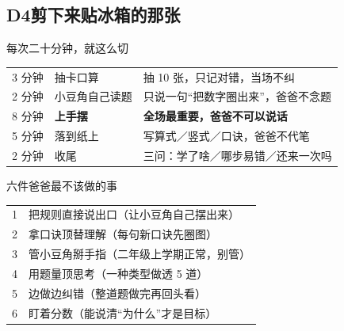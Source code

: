 \clearpage
\subsection*{D4\quad 剪下来贴冰箱的那张}

\begin{center}
\begin{tcolorbox}[enhanced,colback=white,colframe=mainc,boxrule=1.2pt,
                  arc=2mm,width=16.6cm,left=10pt,right=10pt,top=8pt,bottom=8pt]
\begin{center}
{\heiti\large 每次二十分钟，就这么切}\\[4pt]
\renewcommand{\arraystretch}{1.35}
\begin{tabular}{@{}p{2.2cm}p{2.6cm}p{9.6cm}@{}}
\toprule
3 分钟 & 抽卡口算 & 抽 10 张，只记对错，当场不纠 \\
2 分钟 & 小豆角自己读题 & 只说一句“把数字圈出来”，爸爸不念题 \\
8 分钟 & \textbf{上手摆} & \textbf{全场最重要，爸爸不可以说话} \\
5 分钟 & 落到纸上 & 写算式／竖式／口诀，爸爸不代笔 \\
2 分钟 & 收尾 & 三问：学了啥／哪步易错／还来一次吗 \\
\bottomrule
\end{tabular}
\end{center}
\end{tcolorbox}
\end{center}

\begin{center}
\begin{tcolorbox}[enhanced,colback=white,colframe=pitc,boxrule=1.2pt,
                  arc=2mm,width=16.6cm,left=10pt,right=10pt,top=8pt,bottom=8pt]
\begin{center}
{\heiti\large 六件爸爸最不该做的事}\\[4pt]
\begin{tabular}{@{}p{0.6cm}p{14.2cm}@{}}
1 & 把规则直接说出口（让小豆角自己摆出来） \\
2 & 拿口诀顶替理解（每句新口诀先圈图） \\
3 & 管小豆角掰手指（二年级上学期正常，别管） \\
4 & 用题量顶思考（一种类型做透 5 道） \\
5 & 边做边纠错（整道题做完再回头看） \\
6 & 盯着分数（能说清“为什么”才是目标） \\
\end{tabular}
\end{center}
\end{tcolorbox}
\end{center}

